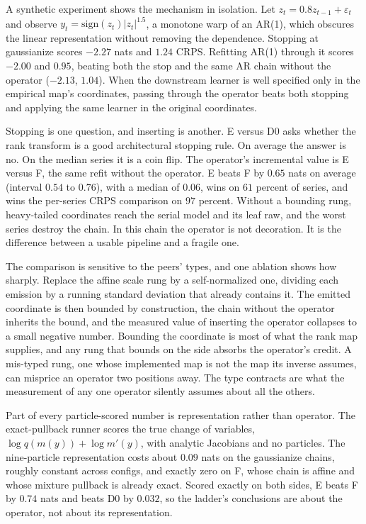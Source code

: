 \documentclass[11pt]{article}
\theoremstyle{remark}
\begin{document}
A synthetic experiment shows the mechanism in isolation. Let $z_t = 0.8 z_{t-1} +
\varepsilon_t$ and observe $y_t = \mathrm{sign}(z_t) |z_t|^{1.5}$, a monotone warp of an
AR(1), which obscures the linear representation without removing the dependence. Stopping at
gaussianize scores $-2.27$ nats and $1.24$ CRPS. Refitting AR(1) through it scores
$-2.00$ and $0.95$, beating both the stop and the same AR chain without the operator
($-2.13$, $1.04$). When the downstream learner is well specified only in the empirical map's
coordinates, passing through the operator beats both stopping and applying the same
learner in the original coordinates.

Stopping is one question, and inserting is another. E versus D0 asks whether the
rank transform is a good architectural stopping rule. On average the answer is no.
On the median series it is a coin flip. The operator's incremental value is E versus
F, the same refit without the operator. E beats F by $0.65$ nats on average
(interval $0.54$ to $0.76$), with a median of $0.06$, wins on $61$ percent of
series, and wins the per-series CRPS comparison on $97$ percent. Without a bounding
rung, heavy-tailed coordinates reach the serial model and its leaf raw, and the
worst series destroy the chain. In this chain the operator is not decoration. It is
the difference between a usable pipeline and a fragile one.

The comparison is sensitive to the peers' types, and one ablation shows how sharply.
Replace the affine scale rung by a self-normalized one, dividing each emission by a
running standard deviation that already contains it. The emitted coordinate is then
bounded by construction, the chain without the operator inherits the bound, and the
measured value of inserting the operator collapses to a small negative number.
Bounding the coordinate is most of what the rank map supplies, and any rung that
bounds on the side absorbs the operator's credit. A mis-typed rung, one whose
implemented map is not the map its inverse assumes, can misprice an operator two
positions away. The type contracts are what the measurement of any one operator
silently assumes about all the others.

Part of every particle-scored number is representation rather than operator. The
exact-pullback runner scores the true change of variables,
$\log q(m(y)) + \log m'(y)$, with analytic Jacobians and no particles. The
nine-particle representation costs about $0.09$ nats on the gaussianize chains,
roughly constant across configs, and exactly zero on F, whose chain is affine and
whose mixture pullback is already exact. Scored exactly on both sides, E beats F by
$0.74$ nats and beats D0 by $0.032$, so the ladder's conclusions are about the
operator, not about its representation.
\end{document}
